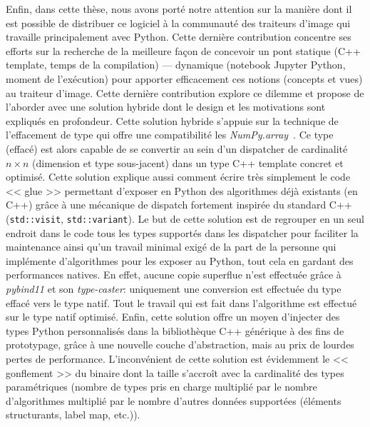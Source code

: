 Enfin, dans cette thèse, nous avons porté notre attention sur la manière dont il est possible de distribuer ce logiciel
à la communauté des traiteurs d'image qui travaille principalement avec Python. Cette dernière contribution concentre
ses efforts sur la recherche de la meilleure façon de concevoir un pont statique (C++ template, temps de la compilation)
--- dynamique (notebook Jupyter Python, moment de l'exécution) pour apporter efficacement ces notions (concepts et vues)
au traiteur d'image. Cette dernière contribution explore ce dilemme et propose de l'aborder avec une solution hybride
dont le design et les motivations sont expliqués en profondeur. Cette solution hybride s'appuie sur la technique de
l'effacement de type qui offre une compatibilité les \emph{NumPy.array}~\parencite{harris.2020.numpy}. Ce type (effacé)
est alors capable de se convertir au sein d'un dispatcher de cardinalité \(n \times n\) (dimension et type sous-jacent)
dans un type C++ template concret et optimisé. Cette solution explique aussi comment écrire très simplement le code <<
glue >> permettant d'exposer en Python des algorithmes déjà existants (en C++) grâce à une mécanique de dispatch
fortement inspirée du standard C++ (\texttt{std::visit}, \texttt{std::variant}). Le but de cette solution est de
regrouper en un seul endroit dans le code tous les types supportés dans les dispatcher pour faciliter la maintenance
ainsi qu'un travail minimal exigé de la part de la personne qui implémente d'algorithmes pour les exposer au Python,
tout cela en gardant des performances natives. En effet, aucune copie superflue n'est effectuée grâce à \emph{pybind11}
et son \emph{type-caster}: uniquement une conversion est effectuée du type effacé vers le type natif. Tout le travail
qui est fait dans l'algorithme est effectué sur le type natif optimisé. Enfin, cette solution offre un moyen d'injecter
des types Python personnalis\'{e}s dans la bibliothèque C++ générique à des fins de prototypage, grâce à une nouvelle
couche d'abstraction, mais au prix de lourdes pertes de performance. L'inconvénient de cette solution est évidemment le
<< gonflement >> du binaire dont la taille s'accroît avec la cardinalité des types paramétriques (nombre de types pris
en charge multiplié par le nombre d'algorithmes multiplié par le nombre d'autres données supportées (éléments
structurants, label map, etc.)).

